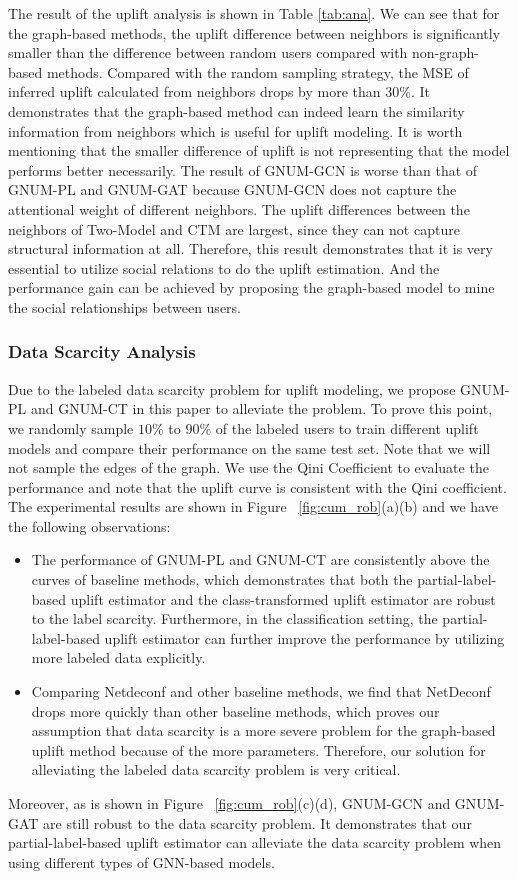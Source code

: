 The result of the uplift analysis is shown in Table \ref{tab:ana}.
We can see that for the graph-based methods, the uplift difference between neighbors is significantly smaller than the difference between random users compared with non-graph-based methods. 
Compared with the random sampling strategy, the MSE of inferred uplift calculated from neighbors drops by more than 30\%.
It demonstrates that the graph-based method can indeed learn the similarity information from neighbors which is useful for uplift modeling. It is worth mentioning that the smaller difference of uplift is not representing that the model performs better necessarily. The result of GNUM-GCN is worse than that of GNUM-PL and GNUM-GAT because GNUM-GCN does not capture the attentional weight of different neighbors.
The uplift differences between the neighbors of Two-Model and CTM are largest, since they can not capture structural information at all. Therefore, this result demonstrates that it is very essential to utilize social relations to do the uplift estimation. And the performance gain can be achieved by proposing the graph-based model to mine the social relationships between users. 

\subsubsection{Data Scarcity Analysis}
\label{sec:scarcity}
Due to the labeled data scarcity problem for uplift modeling, we propose GNUM-PL and GNUM-CT in this paper to alleviate the problem. To prove this point, we randomly sample $10\%$ to $90\%$  of the labeled users to train different uplift models and compare their performance on the same test set. Note that we will not sample the edges of the graph. We use the Qini Coefficient to evaluate the performance and note that the uplift curve is consistent with the Qini coefficient. The experimental results are shown in Figure ~\ref{fig:cum_rob}(a)(b) and we have the following observations: 
\begin{itemize}
    \item The performance of GNUM-PL and GNUM-CT are consistently above the curves of baseline methods, which demonstrates that both the partial-label-based uplift estimator and the class-transformed uplift estimator are robust to the label scarcity. Furthermore, in the classification setting, the partial-label-based uplift estimator can further improve the performance by utilizing more labeled data explicitly. 
    \item Comparing Netdeconf and other baseline methods, we find that NetDeconf drops more quickly than other baseline methods, which proves our assumption that data scarcity is a more severe problem for the graph-based uplift method because of the more parameters. Therefore, our solution for alleviating the labeled data scarcity problem is very critical. 
\end{itemize}

Moreover, as is shown in Figure ~\ref{fig:cum_rob}(c)(d), GNUM-GCN and GNUM-GAT are still robust to the data scarcity problem. It demonstrates that our partial-label-based uplift estimator can alleviate the data scarcity problem when using different types of GNN-based models. 
